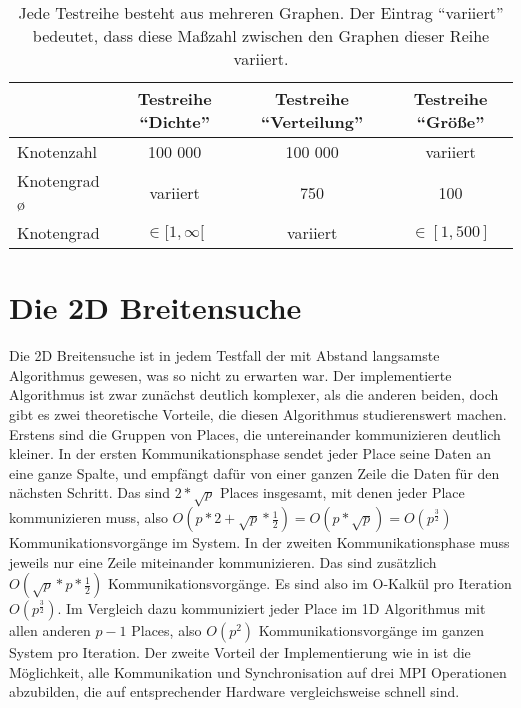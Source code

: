 \begin{table}
\label{tab:Testreihen}
\begin{tabular}{p{3.7cm}|c|c|c}
  & Testreihe \enquote{Dichte} & Testreihe \enquote{Verteilung} & Testreihe \enquote{Größe} \\ \hline \hline
  Knotenzahl & 100 000 &  100 000 & variiert\\
  Knotengrad \o & variiert & 750 & 100\\
  Knotengrad & $\in [1,\infty[$ & variiert & $\in [1,500]$\\
 \end{tabular}
  \caption{Jede Testreihe besteht aus mehreren Graphen. Der Eintrag \enquote{variiert} bedeutet, dass diese Maßzahl zwischen den Graphen dieser Reihe variiert.}
\end{table}

\newpage





\section{Die 2D Breitensuche} %
\label{sec:die_2d_breitensuche}
Die 2D Breitensuche ist in jedem Testfall der mit Abstand langsamste Algorithmus gewesen, was so nicht zu erwarten war. Der implementierte Algorithmus ist zwar zunächst deutlich komplexer, als die anderen beiden, doch gibt es zwei theoretische Vorteile, die diesen Algorithmus studierenswert machen. Erstens sind die Gruppen von Places, die untereinander kommunizieren deutlich kleiner. In der ersten Kommunikationsphase sendet jeder Place seine Daten an eine ganze Spalte, und empfängt dafür von einer ganzen Zeile die Daten für den nächsten Schritt. Das sind $2 * \sqrt{p}$ Places insgesamt, mit denen jeder Place kommunizieren muss, also $O(p * 2 + \sqrt{p} * \frac{1}{2}) = O(p * \sqrt{p})= O(p^{\frac{3}{2}})$ Kommunikationsvorgänge im System. In der zweiten Kommunikationsphase muss jeweils nur eine Zeile miteinander kommunizieren. Das sind zusätzlich $O(\sqrt{p} * p * \frac{1}{2})$ Kommunikationsvorgänge. Es sind also im O-Kalkül pro Iteration $O(p^{\frac{3}{2}})$. Im Vergleich dazu kommuniziert jeder Place im 1D Algorithmus mit allen anderen $p - 1$ Places, also $O(p^2)$ Kommunikationsvorgänge im ganzen System pro Iteration. Der zweite Vorteil der Implementierung wie in \cite{Buluc:2011} ist die Möglichkeit, alle Kommunikation und Synchronisation auf drei MPI Operationen abzubilden, die auf entsprechender Hardware vergleichsweise schnell sind. 

